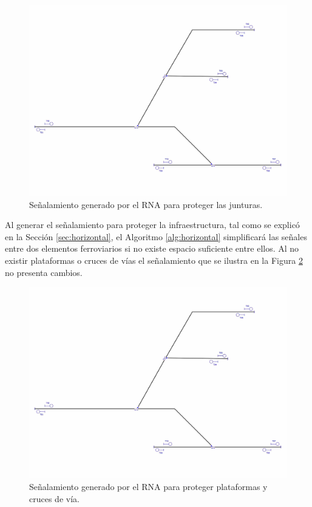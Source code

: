 	\begin{figure}[H]
		\centering
		\includegraphics[width=1\textwidth]{resultados-obtenidos/ejemplo7/images/7_step2.png}
		\centering\caption{Señalamiento generado por el RNA para proteger las junturas.}
		\label{fig:EJ7_4}
	\end{figure}
	
	Al generar el señalamiento para proteger la infraestructura, tal como se explicó en la Sección \ref{sec:horizontal}, el Algoritmo \ref{alg:horizontal} simplificará las señales entre dos elementos ferroviarios si no existe espacio suficiente entre ellos. Al no existir plataformas o cruces de vías el señalamiento que se ilustra en la Figura \ref{fig:EJ7_5} no presenta cambios.
	
	\begin{figure}[H]
		\centering
		\includegraphics[width=1\textwidth]{resultados-obtenidos/ejemplo7/images/7_step3.png}
		\centering\caption{Señalamiento generado por el RNA para proteger plataformas y cruces de vía.}
		\label{fig:EJ7_5}
	\end{figure}
	
